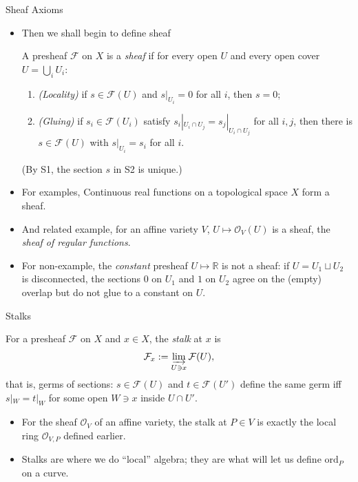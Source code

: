 \documentclass[8pt]{beamer}
\newcommand{\OO}{\mathcal{O}}
\newcommand{\FF}{\mathcal{F}}
\theoremstyle{definition}
\begin{document}
    \begin{frame}{Sheaf Axioms}
        \begin{itemize}
            \item Then we shall begin to define sheaf 
            \begin{definition}[Sheaf]
            A presheaf $\FF$ on $X$ is a \emph{sheaf} if for every open $U$ and every open cover $U = \bigcup_i U_i$:
            \begin{enumerate}
                \item[(S1)] \emph{(Locality)} if $s \in \FF(U)$ and $s|_{U_i} = 0$ for all $i$, then $s = 0$;
                \item[(S2)] \emph{(Gluing)} if $s_i \in \FF(U_i)$ satisfy $s_i|_{U_i \cap U_j} = s_j|_{U_i \cap U_j}$ for all $i, j$, then there is $s \in \FF(U)$ with $s|_{U_i} = s_i$ for all $i$.
            \end{enumerate}
            (By S1, the section $s$ in S2 is unique.)
        \end{definition}
            \item For examples, Continuous real functions on a topological space $X$ form a sheaf.
            \item And related example, for an affine variety $V$, $U \mapsto \OO_V(U)$ is a sheaf, the \emph{sheaf of regular functions}.
            \item For non-example, the \emph{constant} presheaf $U \mapsto \mathbb{R}$ is not a sheaf: if $U = U_1 \sqcup U_2$ is disconnected, the sections $0$ on $U_1$ and $1$ on $U_2$ agree on the (empty) overlap but do not glue to a constant on $U$.
        \end{itemize}
    \end{frame}

    \begin{frame}{Stalks}
        \begin{definition}[Stalk]
            For a presheaf $\FF$ on $X$ and $x \in X$, the \emph{stalk} at $x$ is
            \begin{align*}
                \FF_x := \varinjlim_{U \ni x} \FF(U),
            \end{align*}
            that is, germs of sections: $s \in \FF(U)$ and $t \in \FF(U')$ define the same germ iff $s|_W = t|_W$ for some open $W \ni x$ inside $U \cap U'$.
        \end{definition}
        \begin{itemize}
            \item For the sheaf $\OO_V$ of an affine variety, the stalk at $P \in V$ is exactly the local ring $\OO_{V,P}$ defined earlier.
            \item Stalks are where we do ``local'' algebra; they are what will let us define $\mathrm{ord}_P$ on a curve.
        \end{itemize}
    \end{frame}
\end{document}
